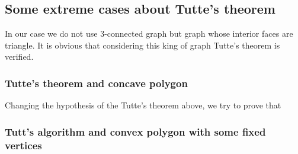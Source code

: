 \subsection{Some extreme cases about Tutte's theorem}
In our case we do not use 3-connected graph but graph whose interior faces are triangle. It is obvious that considering this king of graph Tutte's theorem is verified.
\subsubsection{Tutte's theorem and concave polygon}
Changing the hypothesis of the Tutte's theorem above, we try to prove that 

\subsubsection{Tutt's algorithm and convex polygon with some fixed vertices}
